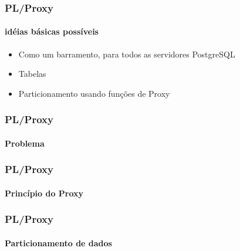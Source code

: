 \documentclass{beamer}
\begin{document}
\begin{frame}
  \frametitle{\textbf{PL/Proxy}}
  \framesubtitle{idéias básicas possíveis}
    \begin{block}{ }
    \begin{itemize}
      \item Como um barramento, para todos as servidores PostgreSQL
      \item Tabelas
      \item Particionamento usando funções de Proxy 
    \end{itemize}
    \end{block}
\end{frame}

\begin{frame}
    \frametitle{\textbf{PL/Proxy}}
    \framesubtitle{Problema}
  \begin{center}
      \par
  \end{center}


\end{frame}

\begin{frame}
    \frametitle{\textbf{PL/Proxy}}
    \framesubtitle{Princípio do Proxy}
  \begin{center}
      \par
  \end{center}


\end{frame}


\begin{frame}
    \frametitle{\textbf{PL/Proxy}}
    \framesubtitle{Particionamento de dados}
  \begin{center}
      \par
  \end{center}


\end{frame}
\end{document}
